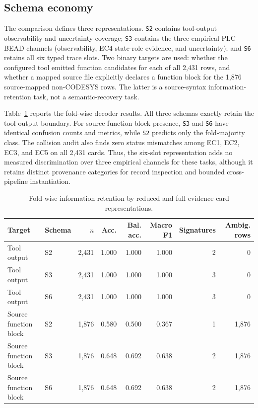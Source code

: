 \documentclass[manuscript,screen,review]{acmart}
\begin{document}
\subsection{Schema economy}

The comparison defines three representations. \texttt{S2} contains tool-output observability and uncertainty coverage; \texttt{S3} contains the three empirical PLC-BEAD channels (observability, EC4 state-role evidence, and uncertainty); and \texttt{S6} retains all six typed trace slots. Two binary targets are used: whether the configured tool emitted function candidates for each of all 2{,}431 rows, and whether a mapped source file explicitly declares a function block for the 1{,}876 source-mapped non-CODESYS rows. The latter is a source-syntax information-retention task, not a semantic-recovery task.

Table~\ref{tab:schema_economy} reports the fold-wise decoder results. All three schemas exactly retain the tool-output boundary. For source function-block presence, \texttt{S3} and \texttt{S6} have identical confusion counts and metrics, while \texttt{S2} predicts only the fold-majority class. The collision audit also finds zero status mismatches among EC1, EC2, EC3, and EC5 on all 2{,}431 cards. Thus, the six-slot representation adds no measured discrimination over three empirical channels for these tasks, although it retains distinct provenance categories for record inspection and bounded cross-pipeline instantiation.

\begin{table}[t]
\centering
\scriptsize
\caption{Fold-wise information retention by reduced and full evidence-card representations.}
\label{tab:schema_economy}
\begin{tabularx}{\textwidth}{>{\raggedright\arraybackslash}Xlrrrrrr}
\toprule
Target & Schema & $n$ & Acc. & Bal. acc. & Macro F1 & Signatures & Ambig. rows \\
\midrule
Tool output & S2 & 2,431 & 1.000 & 1.000 & 1.000 & 2 & 0 \\
Tool output & S3 & 2,431 & 1.000 & 1.000 & 1.000 & 3 & 0 \\
Tool output & S6 & 2,431 & 1.000 & 1.000 & 1.000 & 3 & 0 \\
Source function block & S2 & 1,876 & 0.580 & 0.500 & 0.367 & 1 & 1,876 \\
Source function block & S3 & 1,876 & 0.648 & 0.692 & 0.638 & 2 & 1,876 \\
Source function block & S6 & 1,876 & 0.648 & 0.692 & 0.638 & 2 & 1,876 \\
\bottomrule
\end{tabularx}
\end{table}
\end{document}
